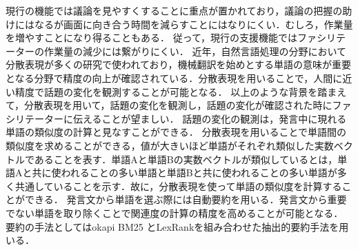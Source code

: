 現行の機能では議論を見やすくすることに重点が置かれており，議論の把握の助けにはなるが画面に向き合う時間を減らすことにはなりにくい．むしろ，作業量を増やすことになり得ることもある．
従って，現行の支援機能ではファシリテーターの作業量の減少には繋がりにくい．
%
近年，自然言語処理の分野において分散表現が多くの研究で使われており，機械翻訳を始めとする単語の意味が重要となる分野で精度の向上が確認されている．分散表現を用いることで，人間に近い精度で話題の変化を観測することが可能となる．
%
以上のような背景を踏まえて，分散表現を用いて，話題の変化を観測し，話題の変化が確認された時にファシリテーターに伝えることが望ましい．
話題の変化の観測は，発言中に現れる単語の類似度の計算と見なすことができる．
分散表現を用いることで単語間の類似度を求めることができる，値が大きいほど単語がそれぞれ類似した実数ベクトルであることを表す．単語Aと単語Bの実数ベクトルが類似しているとは，単語Aと共に使われることの多い単語と単語Bと共に使われることの多い単語が多く共通していることを示す．故に，分散表現を使って単語の類似度を計算することができる．
%
発言文から単語を選ぶ際には自動要約を用いる．発言文から重要でない単語を取り除くことで関連度の計算の精度を高めることが可能となる．
要約の手法としてはokapi BM25 \cite{okapiBM25}とLexRankを組み合わせた抽出的要約手法を用いる．
